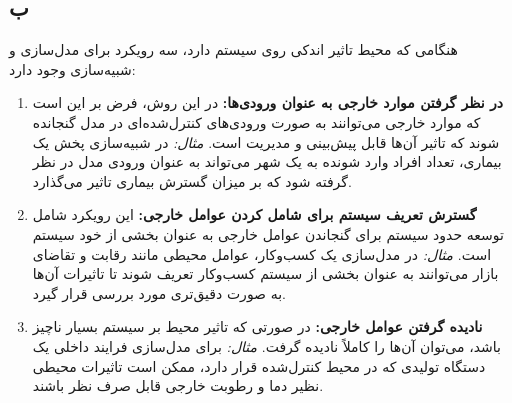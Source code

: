 \subsection*{ب}

هنگامی که محیط تاثیر اندکی روی سیستم دارد، سه رویکرد برای مدل‌سازی و شبیه‌سازی وجود دارد:

\begin{enumerate}
	\item \textbf{در نظر گرفتن موارد خارجی به عنوان ورودی‌ها:}
	در این روش، فرض بر این است که موارد خارجی می‌توانند به صورت ورودی‌های کنترل‌شده‌ای در مدل گنجانده شوند که تاثیر آن‌ها قابل پیش‌بینی و مدیریت است.
	\newline
	\textit{مثال:} در شبیه‌سازی پخش یک بیماری، تعداد افراد وارد شونده به یک شهر می‌تواند به عنوان ورودی مدل در نظر گرفته شود که بر میزان گسترش بیماری تاثیر می‌گذارد.
	
	\item \textbf{گسترش تعریف سیستم برای شامل کردن عوامل خارجی:}
	این رویکرد شامل توسعه حدود سیستم برای گنجاندن عوامل خارجی به عنوان بخشی از خود سیستم است.
	\newline
	\textit{مثال:} در مدل‌سازی یک کسب‌وکار، عوامل محیطی مانند رقابت و تقاضای بازار می‌توانند به عنوان بخشی از سیستم کسب‌وکار تعریف شوند تا تاثیرات آن‌ها به صورت دقیق‌تری مورد بررسی قرار گیرد.
	
	\item \textbf{نادیده گرفتن عوامل خارجی:}
	در صورتی که تاثیر محیط بر سیستم بسیار ناچیز باشد، می‌توان آن‌ها را کاملاً نادیده گرفت.
	\newline
	\textit{مثال:} برای مدل‌سازی فرایند داخلی یک دستگاه تولیدی که در محیط کنترل‌شده قرار دارد، ممکن است تاثیرات محیطی نظیر دما و رطوبت خارجی قابل صرف نظر باشند.
\end{enumerate}